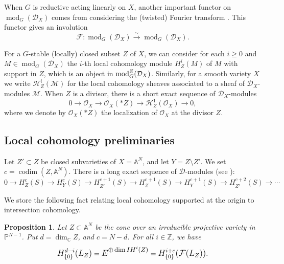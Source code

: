 \documentclass[11pt,reqno]{amsart}
\newcommand{\D}{\mathcal{D}}
\newcommand{\tn}{\textnormal}
\newcommand{\C}{\mathbb{C}}
\newcommand{\opmod}{\operatorname{mod}}
\newcommand{\bb}[1]{\mathbb{#1}}
\newcommand{\mc}[1]{\mathcal{#1}}
\newtheorem{prop}[theorem]{Proposition}
\numberwithin{equation}{section}
\begin{document}
When $G$ is reductive acting linearly on $X$, another important functor on $\opmod_G(\D_X)$ comes from considering the (twisted) Fourier transform \cite[Section 4.3]{lHorincz2019categories}. This functor gives an involution
\[\mc{F} : \opmod_G(\D_X) \xrightarrow{\sim} \opmod_G(\D_X).\]

For a $G$-stable (locally) closed subset $Z$ of $X$, we can consider for each $i\geq 0$ and $M\in\opmod_G(\D_X)$ the $i$-th local cohomology module $H^i_Z(M)$ of $M$ with support in $Z$, which is an object in  $\tn{mod}_{G}^Z(\D_X)$. Similarly, for a smooth variety $X$ we write $\mathscr{H}^i_Z(\mc{M})$ for the local cohomology sheaves associated to a sheaf of $\D_X$-modules $\mc{M}$. When $Z$ is a divisor, there is a short exact sequence of $\D_X$-modules
\begin{equation}\label{comphypn2}
0\longrightarrow \mc{O}_X\longrightarrow  \mc{O}_X(\ast Z)\longrightarrow \mathscr{H}^1_Z(\mc{O}_X)\longrightarrow 0,
\end{equation}
where we denote by $\mc{O}_X(\ast Z)$ the localization of $\mc{O}_X$ at the divisor $Z$.

\subsection{Local cohomology preliminaries}

Let $Z'\subset Z$ be closed subvarieties of $X=\mathbb{A}^N$, and let $Y=Z\setminus Z'$. We set $c=\operatorname{codim}(Z,\mathbb{A}^N)$. There is a long exact sequence of $\D$-modules (see \cite[Proposition 1.9]{hartshornelocal}): 
\begin{equation}\label{locallyclosedsequence}
0 \to H^c_Z(S) \to H^c_Y(S)\to H^{c+1}_{Z'}(S)\to H^{c+1}_Z(S) \to H^{c+1}_Y(S)\to H^{c+2}_{Z'}(S)\to \cdots 		
\end{equation}


We store the following fact relating local cohomology supported at the origin to intersection cohomology.

\begin{prop}\label{prop:intcoho}
Let $Z \subset \mathbb{A}^N$ be the cone over an irreducible projective variety in $\mathbb{P}^{N-1}$. Put $d=\dim_{\C} Z$, and $c= N -d$. For all $i\in \bb{Z}$, we have
\[\mbox{\large\(H_{\{0\}}^{d-i}(L_Z)\)}=\mbox{\large\(E\)}^{\mbox{\small\(\oplus \dim IH^i(Z)\)}}=\mbox{\large\(H_{\{0\}}^{i+c}(\mc{F}(L_Z))\)}. \]


\end{prop}
\end{document}
